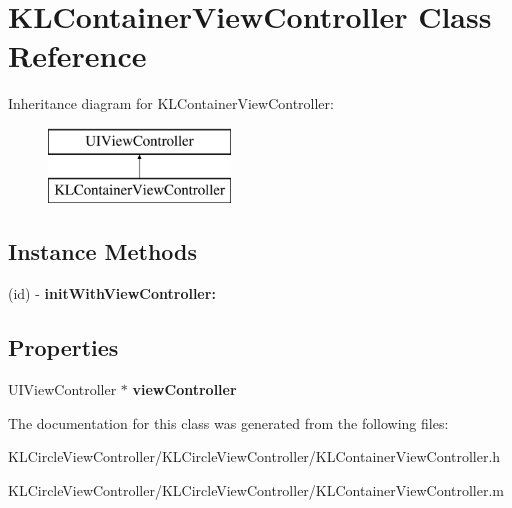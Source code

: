 \hypertarget{interface_k_l_container_view_controller}{\section{K\-L\-Container\-View\-Controller Class Reference}
\label{interface_k_l_container_view_controller}
}
Inheritance diagram for K\-L\-Container\-View\-Controller\-:\begin{figure}[H]
\begin{center}
\leavevmode
\includegraphics[height=2.000000cm]{interface_k_l_container_view_controller}
\end{center}
\end{figure}
\subsection*{Instance Methods}
\begin{DoxyCompactItemize}
\item 
\hypertarget{interface_k_l_container_view_controller_a6efb3e74760ffb157e691919cc57de85}{(id) -\/ {\bfseries init\-With\-View\-Controller\-:}}\label{interface_k_l_container_view_controller_a6efb3e74760ffb157e691919cc57de85}

\end{DoxyCompactItemize}
\subsection*{Properties}
\begin{DoxyCompactItemize}
\item 
\hypertarget{interface_k_l_container_view_controller_ab5504eb8f091714995fcc4c02b20248d}{U\-I\-View\-Controller $\ast$ {\bfseries view\-Controller}}\label{interface_k_l_container_view_controller_ab5504eb8f091714995fcc4c02b20248d}

\end{DoxyCompactItemize}


The documentation for this class was generated from the following files\-:\begin{DoxyCompactItemize}
\item 
K\-L\-Circle\-View\-Controller/\-K\-L\-Circle\-View\-Controller/K\-L\-Container\-View\-Controller.\-h\item 
K\-L\-Circle\-View\-Controller/\-K\-L\-Circle\-View\-Controller/K\-L\-Container\-View\-Controller.\-m\end{DoxyCompactItemize}
